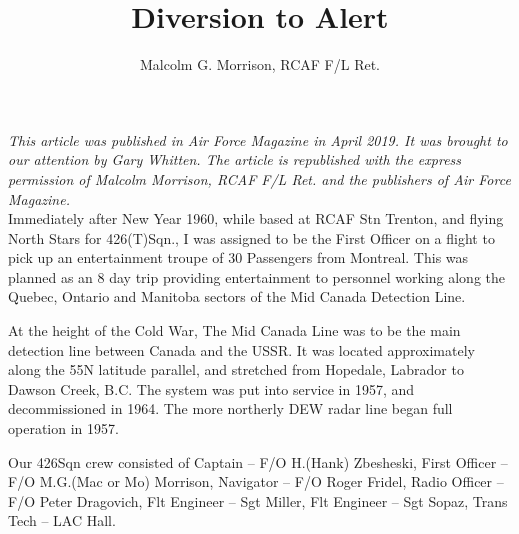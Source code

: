 %


\title{Diversion to Alert}
\author{Malcolm G. Morrison, RCAF F/L Ret.}

\maketitle





\textit{This article was published in Air Force Magazine in April 2019. It was
brought to our attention by Gary Whitten. The article is republished
with the express permission of Malcolm Morrison, RCAF F/L Ret. and the
publishers of Air Force Magazine.}\\

Immediately after New Year 1960, while based at RCAF Stn Trenton, and
flying North Stars for 426(T)Sqn., I was assigned to be the First
Officer on a flight to pick up an entertainment troupe of 30 Passengers
from Montreal. This was planned as an 8 day trip providing
entertainment to personnel working along the Quebec, Ontario and
Manitoba sectors of the Mid Canada Detection Line.

At the height of the Cold War, The Mid Canada Line was to be the main
detection line between Canada and the USSR. It was located
approximately along the 55N latitude parallel, and stretched from
Hopedale, Labrador to Dawson Creek, B.C. The system was put into
service in 1957, and decommissioned in 1964. The more northerly DEW
radar line began full operation in 1957.

Our 426Sqn crew consisted of Captain – F/O H.(Hank) Zbesheski, First
Officer – F/O M.G.(Mac or Mo) Morrison, Navigator – F/O Roger Fridel,
Radio Officer – F/O Peter Dragovich, Flt Engineer – Sgt Miller, Flt
Engineer – Sgt Sopaz, Trans Tech – LAC Hall.


